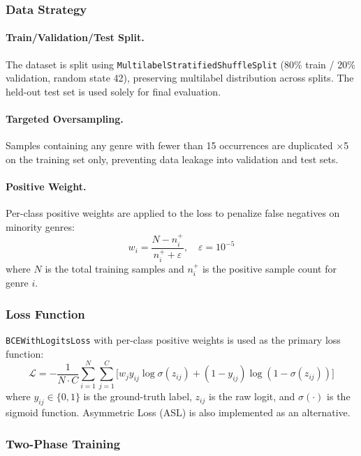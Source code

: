 \documentclass[conference]{IEEEtran}
\begin{document}
\subsubsection{Data Strategy}

\paragraph{Train/Validation/Test Split.}
The dataset is split using \texttt{MultilabelStratifiedShuffleSplit} 
(80\% train / 20\% validation, random state 42), preserving multilabel 
distribution across splits. The held-out test set is used solely for 
final evaluation.

\paragraph{Targeted Oversampling.}
Samples containing any genre with fewer than 15 occurrences are 
duplicated $\times$5 on the training set only, preventing data leakage 
into validation and test sets.

\paragraph{Positive Weight.}
Per-class positive weights are applied to the loss to penalize 
false negatives on minority genres:
\begin{equation}
  w_i = \frac{N - n_i^+}{n_i^+ + \varepsilon}, \quad \varepsilon = 10^{-5}
  \label{eq:posweight}
\end{equation}
where $N$ is the total training samples and $n_i^+$ is the positive 
sample count for genre $i$.

\subsubsection{Loss Function}

\texttt{BCEWithLogitsLoss} with per-class positive weights is used 
as the primary loss function:
\begin{equation}
  \mathcal{L} = -\frac{1}{N \cdot C} \sum_{i=1}^{N} \sum_{j=1}^{C}
  \bigl[ w_j y_{ij} \log \sigma(z_{ij}) 
       + (1{-}y_{ij}) \log (1{-}\sigma(z_{ij})) \bigr]
  \label{eq:bce}
\end{equation}
where $y_{ij} \in \{0,1\}$ is the ground-truth label, $z_{ij}$ is 
the raw logit, and $\sigma(\cdot)$ is the sigmoid function. 
Asymmetric Loss (ASL) is also implemented as an alternative.

\subsubsection{Two-Phase Training}
\end{document}
